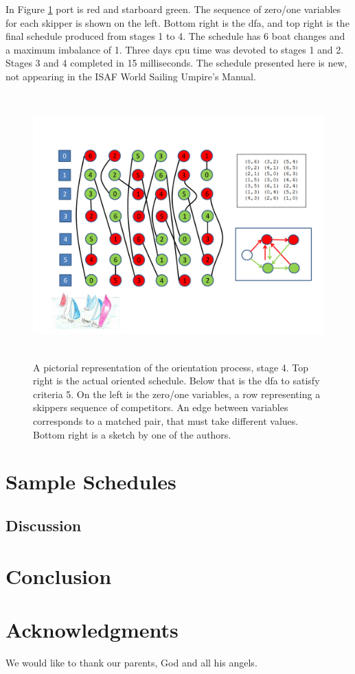 \documentclass{llncs}
\begin{document}
In Figure \ref{oriented} port is red and starboard green. The sequence of zero/one variables for each skipper is shown on the left. Bottom right is the dfa, and top right is the final schedule produced from stages 1 to 4. The schedule has 6 boat changes and a maximum imbalance of 1. Three days cpu time was devoted to stages 1 and 2. Stages 3 and 4 completed in 15 milliseconds. The schedule presented here is new, not appearing in the ISAF World Sailing Umpire's Manual.
\begin{figure}[h]
\centering
\includegraphics[height=10.2cm,width=13.2cm]{oriented.pdf}
\caption{A pictorial representation of the orientation process, stage 4. Top right is the actual oriented schedule. Below that is the dfa to satisfy criteria 5. On the left is the zero/one variables, a row representing a skippers sequence of competitors. An edge between variables corresponds to a matched pair, that must take different values. Bottom right is a sketch by one of the authors.}
\label{oriented} 
\end{figure}

\section{Sample Schedules}

\subsection{Discussion}

\section{Conclusion}

\section*{Acknowledgments}
We would like to thank our parents, God and all his angels.



\end{document}
